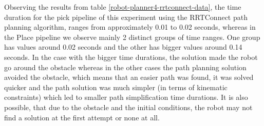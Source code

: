 Observing the results from table \ref{robot-planner4-rrtconnect-data}, the time duration for the pick pipeline of this experiment using the RRTConnect path planning algorithm, 
ranges from approximately 0.01 to 0.02 seconds, whereas in the Place pipeline we observe mainly 2 distinct groups of time ranges. One group has values around 0.02 seconds and the other 
has bigger values around 0.14 seconds. In the case with the bigger time durations, the solution made the robot go around the obstacle whereas in the other cases the path planning solution avoided the obstacle, 
which means that an easier path was found, it was solved quicker and the path solution was much simpler (in terms of kinematic constraints) which led to smaller path simplification time durations. 
It is also possible, that due to the obstacle and the initial conditions, the robot may not find a solution at the first attempt or none at all.

